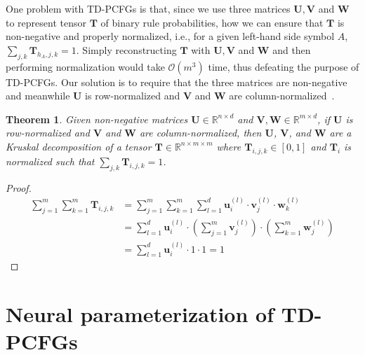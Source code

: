 \documentclass[11pt]{article}
\newtheorem{theorem}{Theorem}
\begin{document}
One problem with TD-PCFGs is that, since we use three matrices $\mathbf{U}, \mathbf{V}$ and $\mathbf{W}$ to represent tensor $\mathbf{T}$ of binary rule probabilities, how we can ensure that $\mathbf{T}$ is non-negative and properly normalized, i.e., for a given left-hand side symbol $A$, $\sum_{j, k}\mathbf{T}_{h_A, j, k} = 1$. 
Simply reconstructing $\mathbf{T}$ with $\mathbf{U}, \mathbf{V}$ and $\mathbf{W}$ and then performing normalization would take $\mathcal{O}(m^3)$ time, thus defeating the purpose of TD-PCFGs.
Our solution is to require that the three matrices are non-negative and meanwhile $\mathbf{U}$ is row-normalized and $\mathbf{V}$ and $\mathbf{W}$ are column-normalized~\citep{shen2018efficient}.

\begin{theorem}\label{prop:kruskal_form}
	Given non-negative matrices $\mathbf{U}\in\mathbb{R}^{n\times d} $ and $\mathbf{V},  \mathbf{W}\in\mathbb{R}^{m\times d}$,
	if $\mathbf{U}$ is row-normalized and $\mathbf{V}$ and $\mathbf{W}$ are column-normalized, then $\mathbf{U}$, $\mathbf{V}$, and $\mathbf{W}$ are a Kruskal decomposition of a tensor $\mathbf{T}\in\mathbb{R}^{n\times m\times m}$ where $\mathbf{T}_{i, j, k}\in[0, 1]$ and $\mathbf{T}_{i}$ is normalized such that $\sum_{j, k}\mathbf{T}_{i, j, k} = 1$.
\end{theorem}
\begin{proof}
	\begin{align*}
	\sum_{j=1}^{m} \sum_{k=1}^{m} \mathbf{T}_{i, j, k} 
	&= \sum_{j=1}^{m} \sum_{k=1}^{m}\sum_{l=1}^{d} \mathbf{u}^{(l)}_{i}\cdot\mathbf{v}^{(l)}_{j}\cdot\mathbf{w}^{(l)}_{k} \\
	&= \sum_{l=1}^{d} \mathbf{u}^{(l)}_{i} \cdot (\sum_{j=1}^{m} \mathbf{v}^{(l)}_{j}) \cdot (\sum_{k=1}^{m} \mathbf{w}^{(l)}_{j}) \\
	&= \sum_{l=1}^{d} \mathbf{u}^{(l)}_{i} \cdot 1\cdot 1 = 1
	\end{align*}
\end{proof}















\section{Neural parameterization of TD-PCFGs}\label{sec:tn-pcfg}
\end{document}
